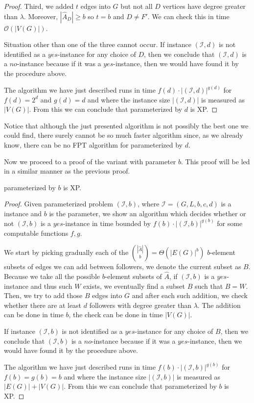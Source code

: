 \begin{proof}
    Third, we added $t$ edges into $G$ but not all $D$ vertices have degree greater than $\lambda$.
    Moreover, $|\hat{A}_D| \geq b$ so $t = b$ and $D \neq F'$.
    We can check this in time $\mathcal{O}(|V(G)|)$.

    Situation other than one of the three cannot occur.
    If instance $(\mathcal{I}, d)$ is not identified as a $yes$-instance for any choice of $D$,
    then we conclude that $(\mathcal{I}, d)$ is a $no$-instance because if it was a $yes$-instance,
    then we would have found it by the procedure above.
    
    The algorithm we have just described runs in time $f(d) \cdot |(\mathcal{I}, d)|^{g(d)}$ for $f(d) = 2^d$ and $g(d) = d$
    and where the instance size $|(\mathcal{I}, d)|$ is measured as $|V(G)|$.
    From this we can conclude that \HL parameterized by $d$ is XP.
\end{proof}

Notice that although the just presented algorithm is not possibly the best one we could find,
there surely cannot be so much faster algorithm since, as we already know,
there can be no FPT algorithm for \HL parameterized by $d$.


Now we proceed to a proof of the variant with parameter $b$.
This proof will be led in a similar manner as the previous proof.

\begin{theorem}
    \HL parameterized by $b$ is XP.
\end{theorem}

\begin{proof}
    Given parameterized problem $(\mathcal{I}, b)$, where $\mathcal{I} = (G, L, b, c, d)$ is a \HLdeg instance and $b$ is the parameter,
    we show an algorithm which decides whether or not $(\mathcal{I}, b)$ is a $yes$-instance in time bounded by
    $f(b) \cdot |(\mathcal{I}, b)|^{g(b)}$ for some computable functions $f,g$.

    We start by picking gradually each of the $\binom{|\hat{A}|}{b} = \Theta(|E(G)|^b)$ $b$-element subsets of
    edges we can add between followers, we denote the current subset as $B$.
    Because we take all the possible $b$-element subsets of $\hat{A}$, if $(\mathcal{I}, b)$ is a $yes$-instance and
    thus such $W$ exists, we eventually find a subset $B$ such that $B = W$.
    Then, we try to add those $B$ edges into $G$ and after each such addition, we check whether there are at least $d$ followers
    with degree greater than $\lambda$. The addition can be done in time $b$, the check can be done in time $|V(G)|$.

    If instance $(\mathcal{I}, b)$ is not identified as a $yes$-instance for any choice of $B$,
    then we conclude that $(\mathcal{I}, b)$ is a $no$-instance because if it was a $yes$-instance,
    then we would have found it by the procedure above.

    The algorithm we have just described runs in time $f(b) \cdot |(\mathcal{I}, b)|^{g(b)}$ for $f(b) = g(b) = b$
    and where the instance size $|(\mathcal{I}, b)|$ is measured as $|E(G)| + |V(G)|$.
    From this we can conclude that \HL parameterized by $b$ is XP.
\end{proof}

